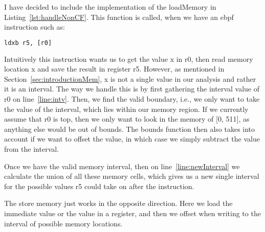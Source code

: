 I have decided to include the implementation of the loadMemory in
Listing~\ref{lst:handleNonCF}. This function is called, when we have an ebpf
instruction such as:
\begin{lstlisting}[language={haskell}, numbers=none]
ldxb r5, [r0]
\end{lstlisting}
Intuitively this instruction wants us to get the value x in r0, then read
memory location x and save the result in register r5. However, as mentioned in
Section~\ref{sec:introductionMem}, x is not a single value in our analysis and
rather it is an interval. The way we handle this is by first gathering the
interval value of r0 on line~\ref{line:intv}. Then, we find the valid boundary,
i.e., we only want to take the value of the interval, which lies within our
memory region. If we currently assume that r0 is top, then we only want to look
in the memory of [0, 511], as anything else would be out of bounds. The bounds
function then also takes into account if we want to offset the value, in which
case we simply subtract the value from the interval.

Once we have the valid memory interval, then on line~\ref{line:newInterval} we
calculate the union of all these memory cells, which gives us a new single
interval for the possible values r5 could take on after the instruction. 

The store memory just works in the opposite direction. Here we load the
immediate value or the value in a register, and then we offset when writing to
the interval of possible memory locations.


